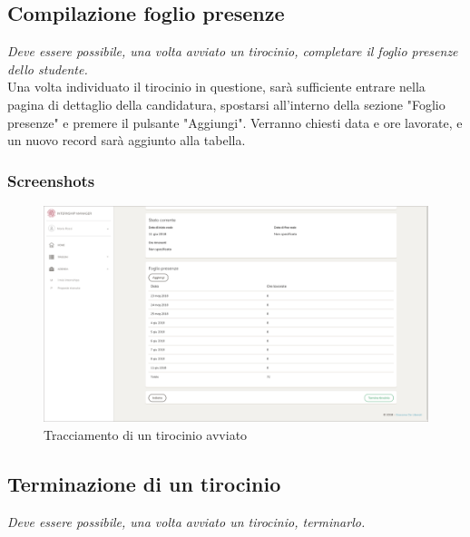 \pagebreak
\subsection{Compilazione foglio presenze}

\textit{Deve essere possibile, una volta avviato un tirocinio, completare il foglio presenze dello studente.} \\

\noindent
Una volta individuato il tirocinio in questione, sarà sufficiente entrare nella pagina di dettaglio della candidatura, spostarsi all'interno della sezione "Foglio presenze" e premere il pulsante "Aggiungi". Verranno chiesti data e ore lavorate, e un nuovo record sarà aggiunto alla tabella.

\subsubsection{Screenshots}
\begin{figure}[H]
	\centering
	\includegraphics[width=1\textwidth]{Figs/screenshots/internshiptrack}     
	\caption[Screenshot: tracciamento di un tirocinio avviato]{Tracciamento di un tirocinio avviato}
	\label{fig:screenshot:8}
\end{figure}

\pagebreak
\subsection{Terminazione di un tirocinio}

\textit{Deve essere possibile, una volta avviato un tirocinio, terminarlo.} \\

